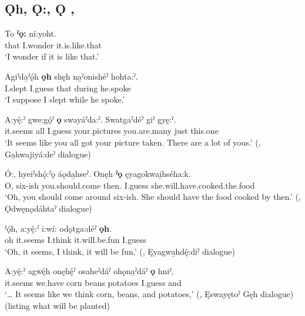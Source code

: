 \subsection*{\textbf{Ǫh, Ǫ:, Ǫ} , } \label{p:[ǫh, ǫ:, ǫ]}

\ea
\label{ex:onpart4}
\gll To \textbf{ˀǫ:} ní:yoht. \\
that I.wonder it.is.like.that\\
\glt ‘I wonder if it is like that.’
\z

\ea
\label{ex:onpart5}
\gll Agiˀda̱ˀǫ́h \textbf{ǫh} shęh na̱ˀonishéˀ hohta:ˀ. \\
I.slept I.guess that during he.spoke\\
\glt ‘I suppose I slept while he spoke.’
\z

\ea
\label{ex:onpart6}
\gll A:yę́:ˀ gwe:gǫ́ˀ \textbf{ǫ} swayáˀda:ˀ. Swatgaˀdéˀ giˀ gyę:ˀ. \\
it.seems all I.guess your.pictures you.are.many just this.one\\
\glt ‘It seems like you all got your picture taken. There are a lot of yous.’ (\cite[257]{mithun_watewayestanih_1984}, Ga̱hwajiyá:deˀ dialogue)
\z

\ea
\label{ex:onpart7}
\gll Ó:, hyeiˀshǫ́:ˀǫ áǫda̱hseˀ. Onęh \textbf{ˀǫ} ęyagokwai̱hséha:k. \\
O, six-ish you.should.come then. I.guess she.will.have.cooked.the.food\\
\glt ‘Oh, you should come around six-ish. She should have the food cooked by then.’ (\cite[279]{mithun_watewayestanih_1984}, Ǫdwęnǫdáhtaˀ dialogue)
\z

\ea
\label{ex:onpart8}
\gll ˀǫ́h, a:yę́:ˀ i:wí: odǫtga:déˀ \textbf{ǫh}. \\
oh it.seems I.think it.will.be.fun I.guess\\
\glt ‘Oh, it seems, I think, it will be fun.’ (\cite[402]{mithun_watewayestanih_1984}, Ęyagwa̱hdę́:diˀ dialogue)
\z


\ea
\label{ex:onpart9}
\gll A:yę́:ˀ agwę́h onęhę́ˀ osaheˀdáˀ ohǫna̱ˀdáˀ \textbf{ǫ} hniˀ, \\
it.seems we.have corn beans potatoes I.guess and\\
\glt ‘… It seems like we think corn, beans, and potatoes,’ (\cite[420]{mithun_watewayestanih_1984}, Ęswayętoˀ Gęh dialogue) (listing what will be planted)
\z

